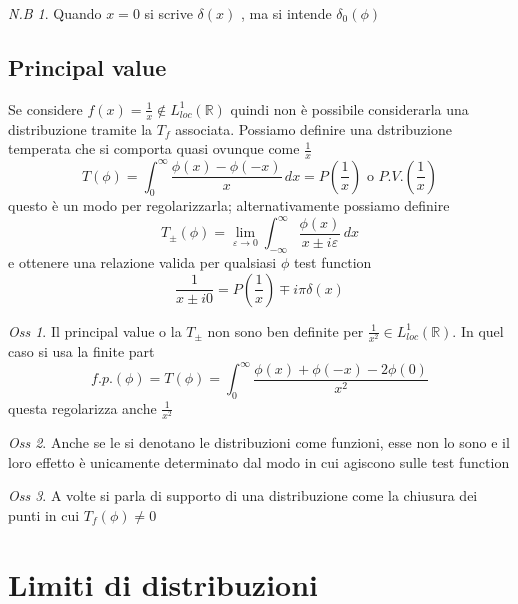 \documentclass[a4paper,11pt]{report}
\theoremstyle{remark}
\newtheorem*{oss}{Oss}
\newtheorem*{nb}{N.B}
\theoremstyle{definition}
\newcommand{\R}{\mathbb{R}}
\begin{document}
\begin{nb}
	Quando $x=0$ si scrive $\delta(x)$ , ma si intende $\delta_0(\phi)$
\end{nb}

\section{Principal value}

Se considere $f(x) = \frac{1}{x} \not\in L^1_{loc}(\R)$ quindi non è possibile considerarla una distribuzione tramite la $T_f$ associata. Possiamo definire una dstribuzione temperata che si comporta quasi ovunque come $\frac{1}{x}$
\begin{equation*}
	T(\phi) = \int_0^\infty \frac{\phi(x)-\phi(-x)}{x} \, dx = P\left(\frac{1}{x}\right) \text{ o } P.V. \left(\frac{1}{x}\right)
\end{equation*}
questo è un modo per regolarizzarla; alternativamente possiamo definire 
\begin{equation*}
	T_{\pm} (\phi) = \lim_{\varepsilon\to 0} \int_{-\infty}^\infty \frac{\phi(x)}{x\pm i\varepsilon} \, dx
\end{equation*}
e ottenere una relazione valida per qualsiasi $\phi$ test function
\begin{equation*}
	\frac{1}{x\pm i0} = P\left(\frac{1}{x}\right) \mp i\pi\delta(x)
\end{equation*}

\begin{oss}
	Il principal value o la $T_\pm$ non sono ben definite per $\frac{1}{x^2} \in L^1_{loc}(\R)$. In quel caso si usa la finite part
	\begin{equation*}
		f.p.(\phi) = T(\phi) = \int_0^\infty \frac{\phi(x)+\phi(-x)-2\phi(0)}{x^2}
	\end{equation*}
	questa regolarizza anche $\frac{1}{x^2}$
\end{oss}

\begin{oss}
	Anche se le si denotano le distribuzioni come funzioni, esse non lo sono e il loro effetto è unicamente determinato dal modo in cui agiscono sulle test function
\end{oss}

\begin{oss}
	A volte si parla di supporto di una distribuzione come la chiusura dei punti in cui $T_f(\phi)\ne 0$
\end{oss}

\chapter{Limiti di distribuzioni }
\end{document}
